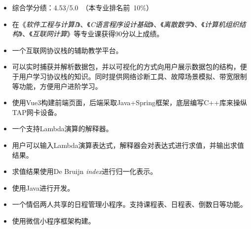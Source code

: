 \documentclass[10pt,a4paper,ragged2e,withhyper]{altacv}
\begin{document}
\begin{paracol}{2}

\begin{itemize}
\item 综合学分绩：4.53/5.0~（本专业排名前~10\%）
\item 在《\emph{软件工程与计算I}》、《\emph{C语言程序设计基础}》、《\emph{离散数学}》、《\emph{计算机组织结构}》、《\emph{互联网计算}》等专业课获得90分以上成绩。
\end{itemize}



\begin{itemize}
\item 一个互联网协议栈的辅助教学平台。
\item 可以实时捕获并解析数据包，并以可视化的方式向用户展示数据包的结构，便于用户学习协议栈的知识。同时提供网络诊断工具、故障场景模拟、带宽限制等功能，方便用户进阶学习。
\item 使用Vue3构建前端页面，后端采取Java+Spring框架，底层编写C++库来操纵TAP网卡设备。

\end{itemize}

\divider

\begin{itemize}
  \item 一个支持Lambda演算的解释器。
  \item 用户可以输入Lambda演算表达式，解释器会对表达式进行求值，并输出求值结果。
  \item 求值结果使用De Bruijn \emph{index}进行归一化表示。
  \item 使用Java进行开发。
\end{itemize}

\divider

\begin{itemize}
  \item 一个情侣两人共享的日程管理小程序。支持课程表、日程表、倒数日等功能。
  \item 使用微信小程序框架构建。
\end{itemize}
\medskip


\end{paracol}
\end{document}
